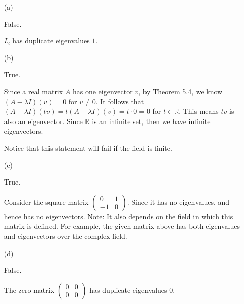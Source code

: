 \begin{Exercise}
	\begin{enumerate}[(a)]
		\item[(a)]
		\begin{answer}
			False.
		\end{answer}
		\begin{solution}
			$I_2$ has duplicate eigenvalues $1$.
		\end{solution}
		
		\item[(b)]
		\begin{answer}
			True.
		\end{answer}
		\begin{solution}
			Since a real matrix $A$ has one eigenvector $v$, by Theorem 5.4, we know $(A-\lambda I)(v) = 0$ for $v\neq 0$. It follows that $(A-\lambda I)(t v) = t(A-\lambda I)(v) = t\cdot 0 = 0$ for $t\in\mathbb{R}$. This means $t v$ is also an eigenvector. Since $\mathbb{R}$ is an infinite set, then we have infinite eigenvectors. 
			
			Notice that this statement will fail if the field is finite.
		\end{solution}
		
		\item[(c)]
		\begin{answer}
			True.
		\end{answer}
		\begin{solution}
			Consider the square matrix $\begin{pmatrix}
			0 & 1 \\
			-1 & 0
			\end{pmatrix}$. Since it has no eigenvalues, and hence has no eigenvectors.
			Note: It also depends on the field in which this matrix is defined. For example, the given matrix above has both eigenvalues and eigenvectors over the complex field.
		\end{solution}
		
		\item[(d)]
		\begin{answer}
			False.
		\end{answer}
		\begin{solution}
			The zero matrix $\begin{pmatrix}
			0 & 0 \\
			0 & 0
			\end{pmatrix}$ has duplicate eigenvalues $0$.
		\end{solution}
		

\end{enumerate}
\end{Exercise}
